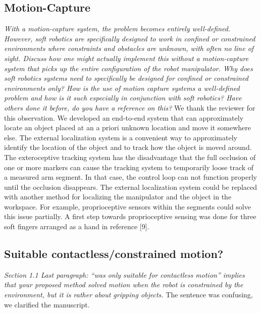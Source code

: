 \documentclass[letterpaper, 10 pt, twocolumn, conference]{article}
\begin{document}
\subsection{Motion-Capture}
\textit{With a motion-capture system, the problem becomes entirely well-defined.
However, soft robotics are specifically designed to work in confined or constrained environments where constraints and obstacles are unknown, with often no line of sight. Discuss how one might actually implement this without a motion-capture system that picks up the entire configuration of the robot manipulator.
Why does soft robotics systems need to specifically be designed for confined or constrained environments only? How is the use of motion capture systems a well-defined problem and how is it such especially in conjunction with soft robotics? Have others done it before, do you have a reference on this?}
%
We thank the reviewer for this observation.
We developed an end-to-end system that can approximately locate an object placed at an a priori unknown location and move it somewhere else. The external localization system is a convenient way to approximately identify the location of the object and to track how the object is moved around.
The exteroceptive tracking system has the disadvantage that the full occlusion of one or more markers can cause the tracking system to temporarily loose track of a measured arm segment. 
In that case, the control loop can not function properly until the occlusion disappears. 
The external localization system could be replaced with another method for localizing the manipulator and the object in the workspace.
For example, proprioceptive sensors within the segments could solve this issue partially. 
A first step towards proprioceptive sensing was done for three soft fingers arranged as a hand in reference [9].
%
\subsection{Suitable contactless/constrained motion?}
\textit{Section 1.1 Last paragraph: “was only suitable for contactless motion” implies that your proposed method solved motion when the robot is constrained by the environment, but it is rather about gripping objects.}
%
The sentence was confusing, we clarified the manuscript.
%
\end{document}
